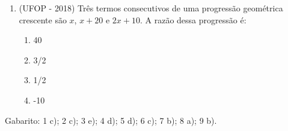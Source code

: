 \begin{enumerate}
\item (UFOP - 2018) Três termos consecutivos de uma progressão geométrica crescente são $x$, $x+20$ e $2x + 10$. A razão dessa progressão é:
\begin{enumerate}
\item 40
\item 3/2
\item 1/2
\item -10
\end{enumerate}



\end{enumerate}

Gabarito: 1 c); 2 c); 3 e); 4 d); 5 d); 6 c); 7 b); 8 a); 9 b).
